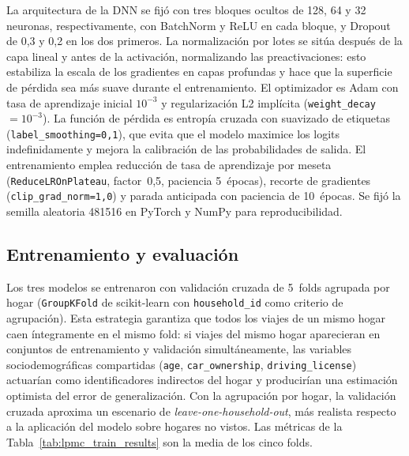 La arquitectura de la DNN se fijó con tres bloques ocultos de 128, 64 y 32 neuronas, respectivamente, con BatchNorm y ReLU en cada bloque, y Dropout de 0,3 y 0,2 en los dos primeros. La normalización por lotes se sitúa después de la capa lineal y antes de la activación, normalizando las preactivaciones: esto estabiliza la escala de los gradientes en capas profundas y hace que la superficie de pérdida sea más suave durante el entrenamiento. El optimizador es Adam con tasa de aprendizaje inicial $10^{-3}$ y regularización L2 implícita (\texttt{weight\_decay}~$= 10^{-3}$). La función de pérdida es entropía cruzada con suavizado de etiquetas (\texttt{label\_smoothing=0,1}), que evita que el modelo maximice los logits indefinidamente y mejora la calibración de las probabilidades de salida. El entrenamiento emplea reducción de tasa de aprendizaje por meseta (\texttt{ReduceLROnPlateau}, factor~0,5, paciencia 5~épocas), recorte de gradientes (\texttt{clip\_grad\_norm=1,0}) y parada anticipada con paciencia de 10~épocas. Se fijó la semilla aleatoria 481516 en PyTorch y NumPy para reproducibilidad.

\subsection{Entrenamiento y evaluación}
\label{subsec:impl_lpmc_entrenamiento}

Los tres modelos se entrenaron con validación cruzada de 5~folds agrupada por hogar (\texttt{GroupKFold} de scikit-learn con \texttt{household\_id} como criterio de agrupación). Esta estrategia garantiza que todos los viajes de un mismo hogar caen íntegramente en el mismo fold: si viajes del mismo hogar aparecieran en conjuntos de entrenamiento y validación simultáneamente, las variables sociodemográficas compartidas (\texttt{age}, \texttt{car\_ownership}, \texttt{driving\_license}) actuarían como identificadores indirectos del hogar y producirían una estimación optimista del error de generalización. Con la agrupación por hogar, la validación cruzada aproxima un escenario de \textit{leave-one-household-out}, más realista respecto a la aplicación del modelo sobre hogares no vistos. Las métricas de la Tabla~\ref{tab:lpmc_train_results} son la media de los cinco folds.

